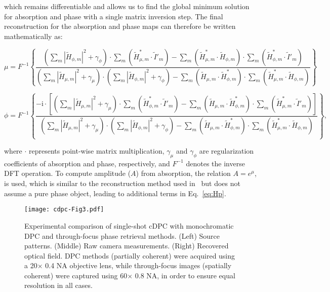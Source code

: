 \noindent which remains differentiable and allows us to find the global minimum solution for absorption and phase with a single matrix inversion step. The final reconstruction for the absorption and phase maps can therefore be written mathematically as:

\begin{equation} \label{eq:Ha}
\mu = F^{-1}\left\{\frac{\left(\sum\limits_{m}|\tilde{H}_{\phi,m}|^2+\gamma_{\phi}\right)\cdot\sum\limits_{m}\left(\tilde{H}^*_{\mu,m}\cdot\tilde{I}'_{m}\right)-\sum\limits_{m} \left ( \tilde{H}^*_{\mu,m}\cdot\tilde{H}_{\phi,m} \right ) \cdot\sum\limits_{m}\left(\tilde{H}^*_{\phi,m}\cdot\tilde{I}'_{m}\right)}{\left(\sum\limits_{m}|\tilde{H}_{\mu,m}|^2+\gamma_{\mu}\right)\cdot\left(\sum\limits_{m}|\tilde{H}_{\phi,m}|^2+\gamma_{\phi}\right) - \sum\limits_{m}\left(\tilde{H}_{\mu,m}\cdot\tilde{H}^*_{\phi,m}\right)\cdot\sum\limits_{m}\left(\tilde{H}^*_{\mu,m}\cdot\tilde{H}_{\phi,m}\right)} \right\}
\end{equation}

\begin{equation} \label{eq:Hp}
\phi = F^{-1}\left\{\frac{-\mathrm{i}\cdot\left[\left(\sum\limits_{m}|\tilde{H}_{\mu,m}|^2+\gamma_{\mu}\right)\cdot\sum\limits_{m}\left(\tilde{H}^*_{\phi,m}\cdot\tilde{I}'_{m}\right)-\sum\limits_{m}\left(\tilde{H}_{\mu,m}\cdot\tilde{H}^*_{\phi,m}\right)\cdot\sum\limits_{m}\left(\tilde{H}^*_{\mu,m}\cdot\tilde{I}'_{m}\right)\right]}{\left(\sum\limits_{m}|\tilde{H}_{\mu,m}|^2+\gamma_{\mu}\right)\cdot\left(\sum\limits_{m}|\tilde{H}_{\phi,m}|^2+\gamma_{\phi}\right)-\sum\limits_{m}\left(\tilde{H}_{\mu,m}\cdot\tilde{H}^*_{\phi,m}\right)\cdot\sum\limits_{m} \left( \tilde{H}^*_{\mu,m}\cdot\tilde{H}_{\phi,m} \right )} \right\},
\end{equation}

\noindent where $\cdot$ represents point-wise matrix multiplication, $\gamma_\mu$ and $\gamma_\phi$ are regularization coefficients of absorption and phase, respectively, and $F^{-1}$ denotes the inverse DFT operation. To compute amplitude ($A$) from absorption, the relation $A = e^{\mu}$, is used, which is similar to the reconstruction method used in~\cite{tian2015quantitative} but does not assume a pure phase object, leading to additional terms in Eq.~\ref{eq:Hp}.

\begin{figure}[bth]
\centering
\texttt{[image: cdpc-Fig3.pdf]}
\caption{\label{fig:spatialRes}
Experimental comparison of single-shot cDPC with monochromatic DPC and through-focus phase retrieval methods. (Left) Source patterns. (Middle) Raw camera measurements. (Right) Recovered optical field. DPC methods (partially coherent) were acquired using a 20$\times$ 0.4 NA objective lens, while through-focus images (spatially coherent) were captured using 60$\times$ 0.8 NA, in order to ensure equal resolution in all cases.}
\end{figure}

